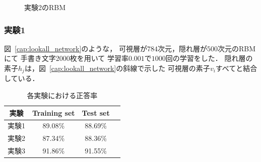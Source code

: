 \begin{figure}[hbt]
\begin{minipage}{0.45\columnwidth}
  \caption{実験2のRBM}
  \label{cap:lookpartial_network}
\end{minipage}
\end{figure}
\subsubsection{実験1}
図~\ref{cap:lookall_network}のような，
可視層が$784$次元，隠れ層が$500$次元のRBMにて
手書き文字2000枚を用いて
学習率$0.001$で$1000$回の学習をした．
隠れ層の素子${h_j}$は，図~\ref{cap:lookall_network}の斜線で示した
可視層の素子$v_i$すべてと結合している．
\begin{table}%
\begin{center}
  \caption{各実験における正答率}
  \label{tab:result}
  \begin{tabular}{cccc}
    \hline
    実験   & Training set & Test set\\
    \hline \hline
    実験1  & 89.08\%      & 88.69\% \\
    実験2  & 87.34\%      & 88.36\% \\
    実験3  & 91.86\%      & 91.55\% \\
    \hline
  \end{tabular}
\end{center}
\end{table}

